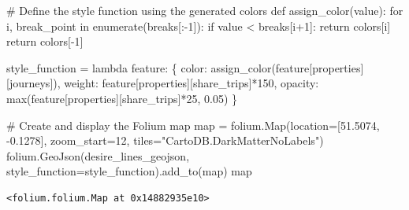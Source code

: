 \documentclass[
  letterpaper,
  DIV=11,
  numbers=noendperiod]{scrreprt}
\newenvironment{Shaded}{\begin{snugshade}}{\end{snugshade}}
\newcommand{\BuiltInTok}[1]{\textcolor[rgb]{0.00,0.23,0.31}{#1}}
\newcommand{\CommentTok}[1]{\textcolor[rgb]{0.37,0.37,0.37}{#1}}
\newcommand{\ControlFlowTok}[1]{\textcolor[rgb]{0.00,0.23,0.31}{#1}}
\newcommand{\DecValTok}[1]{\textcolor[rgb]{0.68,0.00,0.00}{#1}}
\newcommand{\FloatTok}[1]{\textcolor[rgb]{0.68,0.00,0.00}{#1}}
\newcommand{\KeywordTok}[1]{\textcolor[rgb]{0.00,0.23,0.31}{#1}}
\newcommand{\NormalTok}[1]{\textcolor[rgb]{0.00,0.23,0.31}{#1}}
\newcommand{\OperatorTok}[1]{\textcolor[rgb]{0.37,0.37,0.37}{#1}}
\newcommand{\StringTok}[1]{\textcolor[rgb]{0.13,0.47,0.30}{#1}}
\begin{document}
\begin{Shaded}
\begin{Highlighting}[]
\CommentTok{\# Define the style function using the generated colors}
\KeywordTok{def}\NormalTok{ assign\_color(value):}
    \ControlFlowTok{for}\NormalTok{ i, break\_point }\KeywordTok{in} \BuiltInTok{enumerate}\NormalTok{(breaks[:}\OperatorTok{{-}}\DecValTok{1}\NormalTok{]):}
        \ControlFlowTok{if}\NormalTok{ value }\OperatorTok{\textless{}}\NormalTok{ breaks[i}\OperatorTok{+}\DecValTok{1}\NormalTok{]:}
            \ControlFlowTok{return}\NormalTok{ colors[i]}
    \ControlFlowTok{return}\NormalTok{ colors[}\OperatorTok{{-}}\DecValTok{1}\NormalTok{]}

\NormalTok{style\_function }\OperatorTok{=} \KeywordTok{lambda}\NormalTok{ feature: \{}
    \StringTok{\textquotesingle{}color\textquotesingle{}}\NormalTok{: assign\_color(feature[}\StringTok{\textquotesingle{}properties\textquotesingle{}}\NormalTok{][}\StringTok{\textquotesingle{}journeys\textquotesingle{}}\NormalTok{]),}
    \StringTok{\textquotesingle{}weight\textquotesingle{}}\NormalTok{: feature[}\StringTok{\textquotesingle{}properties\textquotesingle{}}\NormalTok{][}\StringTok{\textquotesingle{}share\_trips\textquotesingle{}}\NormalTok{]}\OperatorTok{*}\DecValTok{150}\NormalTok{,  }
    \StringTok{\textquotesingle{}opacity\textquotesingle{}}\NormalTok{: }\BuiltInTok{max}\NormalTok{(feature[}\StringTok{\textquotesingle{}properties\textquotesingle{}}\NormalTok{][}\StringTok{\textquotesingle{}share\_trips\textquotesingle{}}\NormalTok{]}\OperatorTok{*}\DecValTok{25}\NormalTok{, }\FloatTok{0.05}\NormalTok{)}
\NormalTok{\}}
\end{Highlighting}
\end{Shaded}

\begin{Shaded}
\begin{Highlighting}[]
\CommentTok{\# Create and display the Folium map}
\BuiltInTok{map} \OperatorTok{=}\NormalTok{ folium.Map(location}\OperatorTok{=}\NormalTok{[}\FloatTok{51.5074}\NormalTok{, }\OperatorTok{{-}}\FloatTok{0.1278}\NormalTok{], zoom\_start}\OperatorTok{=}\DecValTok{12}\NormalTok{, tiles}\OperatorTok{=}\StringTok{"CartoDB.DarkMatterNoLabels"}\NormalTok{)}
\NormalTok{folium.GeoJson(desire\_lines\_geojson, style\_function}\OperatorTok{=}\NormalTok{style\_function).add\_to(}\BuiltInTok{map}\NormalTok{)}
\BuiltInTok{map}
\end{Highlighting}
\end{Shaded}

\begin{verbatim}
<folium.folium.Map at 0x14882935e10>
\end{verbatim}
\end{document}
